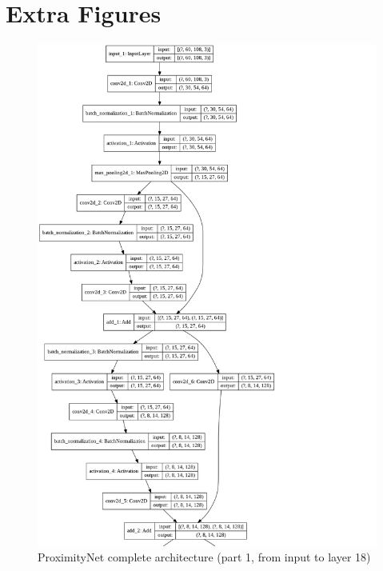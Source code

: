 
\chapter{Extra Figures}
\label{chap:extra-figures}
\let\clearpage\relax

\begin{figure}[!htb]
	\centering
	\includegraphics[width=1\textwidth]{"contents/images/03-proximitynet-3A"}
	\caption[ProximityNet complete architecture (part 1)]{ProximityNet complete architecture (part 1, from input to layer 18)}
	\label{fig:proximitynet-architecture-3a}
\end{figure}

